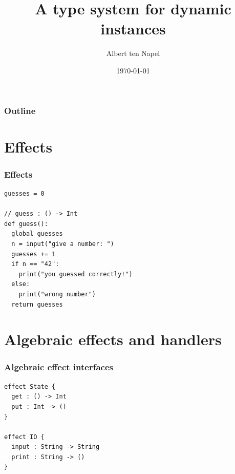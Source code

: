 \documentclass{beamer}
\title[A type system for dynamic instances]{A type system for dynamic instances}
\institute[TU Delft]{Delft University of Technology}
\author{Albert ten Napel}
\date{\today}
\newcommand*\titleTOC{Outline}
\begin{document}
{
%
\frame{\titlepage}
}

{
\begin{frame}\frametitle{\titleTOC}
	\tableofcontents
\end{frame}
}

\section{Effects}

\begin{frame}[fragile]\frametitle{Effects}
	\begin{example}
		\begin{verbatim}
guesses = 0

// guess : () -> Int
def guess():
  global guesses
  n = input("give a number: ")
  guesses += 1
  if n == "42":
    print("you guessed correctly!")
  else:
    print("wrong number")
  return guesses
		\end{verbatim}
	\end{example}
\end{frame}

\section{Algebraic effects and handlers}

\begin{frame}[fragile]\frametitle{Algebraic effect interfaces}
	\begin{example}
		\begin{verbatim}
effect State {
  get : () -> Int
  put : Int -> ()
}

effect IO {
  input : String -> String
  print : String -> ()
}
		\end{verbatim}
	\end{example}
\end{frame}
\end{document}
